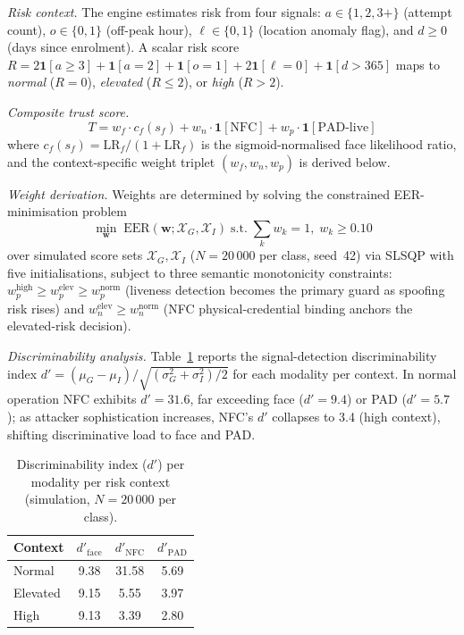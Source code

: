 \documentclass[conference]{IEEEtran}
\begin{document}
\textit{Risk context.} The engine estimates risk from four signals:
\(a \in \{1,2,3+\}\) (attempt count), \(o \in \{0,1\}\) (off-peak hour),
\(\ell \in \{0,1\}\) (location anomaly flag), and \(d \geq 0\) (days since
enrolment). A scalar risk score \(R = 2\mathbf{1}[a \geq 3] + \mathbf{1}[a=2]
+ \mathbf{1}[o=1] + 2\mathbf{1}[\ell=0] + \mathbf{1}[d>365]\) maps to
\textit{normal} (\(R=0\)), \textit{elevated} (\(R \leq 2\)), or \textit{high}
(\(R>2\)).

\textit{Composite trust score.}
\begin{equation}
  T = w_f \cdot c_f(s_f) + w_n \cdot \mathbf{1}[\mathrm{NFC}]
        + w_p \cdot \mathbf{1}[\mathrm{PAD\text{-}live}]
  \label{eq:ats}
\end{equation}
where \(c_f(s_f) = \mathrm{LR}_f/(1+\mathrm{LR}_f)\) is the sigmoid-normalised
face likelihood ratio, and the context-specific weight triplet
\((w_f, w_n, w_p)\) is derived below.

\textit{Weight derivation.}
Weights are determined by solving the constrained EER-minimisation problem
\begin{equation}
  \min_{\mathbf{w}}\;\mathrm{EER}(\mathbf{w};\mathcal{X}_G,\mathcal{X}_I)
  \;\text{s.t.}\;\textstyle\sum_k w_k = 1,\; w_k \geq 0.10
  \label{eq:ats_opt}
\end{equation}
over simulated score sets \(\mathcal{X}_G, \mathcal{X}_I\)
(\(N{=}20\,000\) per class, seed~42) via SLSQP with five initialisations,
subject to three semantic monotonicity constraints:
\(w_p^\text{high}\!\geq w_p^\text{elev}\!\geq w_p^\text{norm}\)
(liveness detection becomes the primary guard as spoofing risk rises)
and \(w_n^\text{elev}\!\geq w_n^\text{norm}\) (NFC physical-credential
binding anchors the elevated-risk decision).

\textit{Discriminability analysis.}
Table~\ref{tab:dprime} reports the signal-detection discriminability index
\(d' = (\mu_G - \mu_I)/\sqrt{(\sigma_G^2+\sigma_I^2)/2}\) for each
modality per context.
In normal operation NFC exhibits \(d'=31.6\), far exceeding face
(\(d'=9.4\)) or PAD (\(d'=5.7\)); as attacker sophistication increases,
NFC's \(d'\) collapses to 3.4 (high context), shifting discriminative
load to face and PAD.

\begin{table}[h]
\centering
\caption{Discriminability index (\(d'\)) per modality per risk context
(simulation, \(N{=}20\,000\) per class).}
\label{tab:dprime}
\begin{tabular}{lccc}
\toprule
Context & \(d'_{\mathrm{face}}\) & \(d'_{\mathrm{NFC}}\) & \(d'_{\mathrm{PAD}}\) \\
\midrule
Normal   & 9.38 & 31.58 & 5.69 \\
Elevated & 9.15 &  5.55 & 3.97 \\
High     & 9.13 &  3.39 & 2.80 \\
\bottomrule
\end{tabular}
\end{table}
\end{document}
